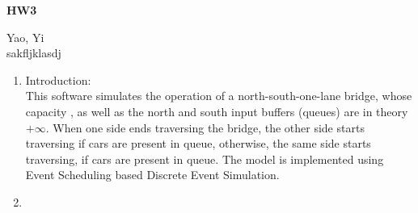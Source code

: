 \documentclass{article}
\begin{document}
	\begin{center}
		\begin{LARGE}
			\textbf{HW3}\\
		\end{LARGE}
		Yao, Yi\\
		sakfljklasdj
	\end{center}
	\begin{enumerate}
		\item 
		Introduction:\\
		This software simulates the operation of a north-south-one-lane bridge, whose capacity , as well as the north and south input buffers (queues) are in theory $+\infty$. When one side ends traversing the bridge, the other side starts traversing if cars are present in queue, otherwise, the same side starts traversing, if cars are present in queue. The model is implemented using Event Scheduling based Discrete Event Simulation.
		\item 
		
	\end{enumerate}
	
	
\end{document}
